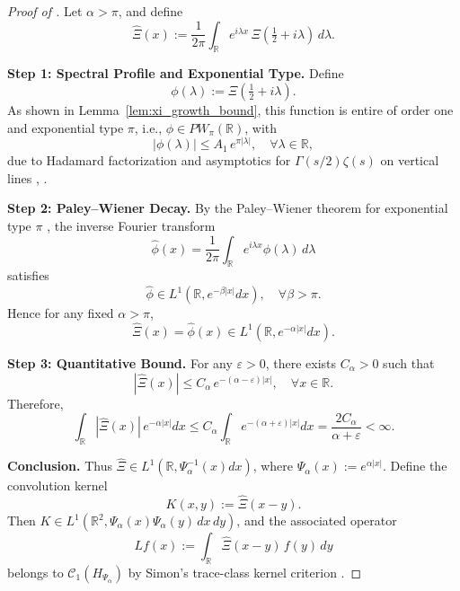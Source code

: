 \begin{proof}[Proof of ]
Let \( \alpha > \pi \), and define
\[
\widehat{\Xi}(x) := \frac{1}{2\pi} \int_{\mathbb{R}} e^{i\lambda x} \, \Xi\left( \tfrac{1}{2} + i\lambda \right)\, d\lambda.
\]

\medskip
\noindent\textbf{Step 1: Spectral Profile and Exponential Type.}
Define
\[
\phi(\lambda) := \Xi\left( \tfrac{1}{2} + i\lambda \right).
\]
As shown in Lemma~\ref{lem:xi_growth_bound}, this function is entire of order one and exponential type \( \pi \), i.e., \( \phi \in PW_\pi(\mathbb{R}) \), with
\[
|\phi(\lambda)| \le A_1\, e^{\pi |\lambda|}, \quad \forall \lambda \in \mathbb{R},
\]
due to Hadamard factorization and asymptotics for \( \Gamma(s/2)\zeta(s) \) on vertical lines \cite[Ch.~3]{Levin1996EntireLectures}, \cite[Ch.~2]{Titchmarsh1986Zeta}.

\medskip
\noindent\textbf{Step 2: Paley–Wiener Decay.}
By the Paley–Wiener theorem for exponential type \( \pi \) \cite[Thm.~3.2.4]{Levin1996EntireLectures}, the inverse Fourier transform
\[
\widehat{\phi}(x) = \frac{1}{2\pi} \int_{\mathbb{R}} e^{i\lambda x} \phi(\lambda)\, d\lambda
\]
satisfies
\[
\widehat{\phi} \in L^1(\mathbb{R}, e^{-\beta |x|} dx), \quad \forall \beta > \pi.
\]
Hence for any fixed \( \alpha > \pi \),
\[
\widehat{\Xi}(x) = \widehat{\phi}(x) \in L^1(\mathbb{R}, e^{-\alpha |x|} dx).
\]

\medskip
\noindent\textbf{Step 3: Quantitative Bound.}
For any \( \varepsilon > 0 \), there exists \( C_\alpha > 0 \) such that
\[
|\widehat{\Xi}(x)| \le C_\alpha\, e^{-(\alpha - \varepsilon)|x|}, \quad \forall x \in \mathbb{R}.
\]
Therefore,
\[
\int_{\mathbb{R}} |\widehat{\Xi}(x)|\, e^{-\alpha |x|} dx
\le C_\alpha \int_{\mathbb{R}} e^{-(\alpha + \varepsilon)|x|} dx
= \frac{2 C_\alpha}{\alpha + \varepsilon} < \infty.
\]

\medskip
\noindent\textbf{Conclusion.}
Thus \( \widehat{\Xi} \in L^1(\mathbb{R}, \Psi_\alpha^{-1}(x) dx) \), where \( \Psi_\alpha(x) := e^{\alpha |x|} \). Define the convolution kernel
\[
K(x,y) := \widehat{\Xi}(x - y).
\]
Then \( K \in L^1(\mathbb{R}^2, \Psi_\alpha(x)\Psi_\alpha(y)\, dx\,dy) \), and the associated operator
\[
L f(x) := \int_{\mathbb{R}} \widehat{\Xi}(x - y)\, f(y)\, dy
\]
belongs to \( \mathcal{C}_1(H_{\Psi_\alpha}) \) by Simon’s trace-class kernel criterion \cite[Thm.~4.2]{Simon2005TraceIdeals}.
\end{proof}
